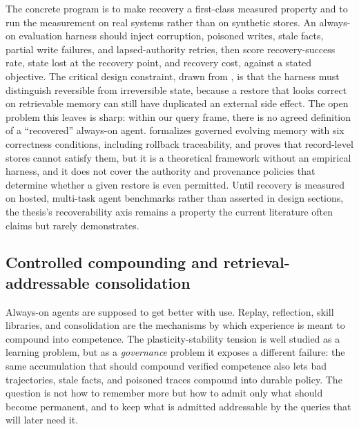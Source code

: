 The concrete program is to make recovery a first-class measured property and to run
the measurement on real systems rather than on synthetic stores. An always-on
evaluation harness should inject corruption, poisoned writes, stale facts, partial
write failures, and lapsed-authority retries, then score recovery-success rate,
state lost at the recovery point, and recovery cost, against a stated objective. The
critical design constraint, drawn from \citet{zheng2026acrfence}, is that the harness
must distinguish reversible from irreversible state, because a restore that looks
correct on retrievable memory can still have duplicated an external side effect. The
open problem this leaves is sharp: within our query frame, there is no agreed definition of a
``recovered'' always-on agent. \citet{orogat2026gem} formalizes governed evolving
memory with six correctness conditions, including rollback traceability, and proves
that record-level stores cannot satisfy them, but it is a theoretical framework
without an empirical harness, and it does not cover the authority and provenance
policies that determine whether a given restore is even permitted. Until recovery is
measured on hosted, multi-task agent benchmarks rather than asserted in design
sections, the thesis's recoverability axis remains a property the current
literature often claims but rarely demonstrates.

\subsection{Controlled compounding and retrieval-addressable consolidation}

Always-on agents are supposed to get better with use. Replay, reflection, skill
libraries, and consolidation are the mechanisms by which experience is meant to
compound into competence. The plasticity-stability tension is well studied as a
learning problem, but as a \emph{governance} problem it exposes a different failure:
the same accumulation that should compound verified competence also lets bad
trajectories, stale facts, and poisoned traces compound into durable policy. The
question is not how to remember more but how to admit only what should become
permanent, and to keep what is admitted addressable by the queries that will later
need it.

